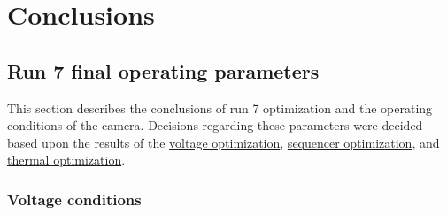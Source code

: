 \section{Conclusions}\label{conclusions}

\subsection{Run 7 final operating
parameters}\label{run-7-final-operating-parameters}

This section describes the conclusions of run 7 optimization and the
operating conditions of the camera. Decisions regarding these parameters
were decided based upon the results of the
\href{https://sitcomtn-148.lsst.io/\#persistence-optimization}{voltage
optimization},
\href{https://sitcomtn-148.lsst.io/\#sequencer-optimization}{sequencer
optimization}, and
\href{https://sitcomtn-148.lsst.io/\#thermal-optimization}{thermal
optimization}.

\subsubsection{Voltage conditions}\label{voltage-conditions}

